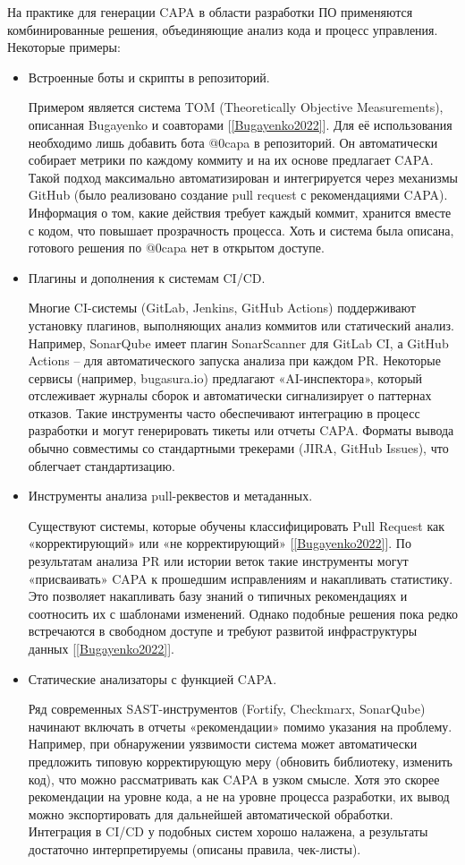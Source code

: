 На практике для генерации CAPA в области разработки ПО применяются комбинированные решения, объединяющие анализ кода и процесс управления. Некоторые примеры:

\begin{itemize}
	\item Встроенные боты и скрипты в репозиторий. 
	
	Примером является система TOM (Theoretically Objective Measurements), описанная Bugayenko  и соавторами [\ref{Bugayenko2022}]. Для её использования необходимо лишь добавить бота @0capa в репозиторий. Он автоматически собирает метрики по каждому коммиту и на их основе предлагает CAPA. Такой подход максимально автоматизирован и интегрируется через механизмы GitHub (было реализовано создание pull request с рекомендациями CAPA). Информация о том, какие действия требует каждый коммит, хранится вместе с кодом, что повышает прозрачность процесса. Хоть и система была описана, готового решения по @0capa нет в открытом доступе.
	
	\item Плагины и дополнения к системам CI/CD.
	
	Многие CI-системы (GitLab, Jenkins, GitHub Actions) поддерживают установку плагинов, выполняющих анализ коммитов или статический анализ. Например, SonarQube имеет плагин SonarScanner для GitLab CI, а GitHub Actions – для автоматического запуска анализа при каждом PR. Некоторые сервисы (например, bugasura.io) предлагают «AI-инспектора», который отслеживает журналы сборок и автоматически сигнализирует о паттернах отказов. Такие инструменты часто обеспечивают интеграцию в процесс разработки и могут генерировать тикеты или отчеты CAPA. Форматы вывода обычно совместимы со стандартными трекерами (JIRA, GitHub Issues), что облегчает стандартизацию.
	
	\item Инструменты анализа pull-реквестов и метаданных.
	
	Существуют системы, которые обучены классифицировать Pull Request как «корректирующий» или «не корректирующий» [\ref{Bugayenko2022}]. По результатам анализа PR или истории веток такие инструменты могут «присваивать» CAPA к прошедшим исправлениям и накапливать статистику.  Это позволяет накапливать базу знаний о типичных рекомендациях и соотносить их с шаблонами изменений. Однако подобные решения пока редко встречаются в свободном доступе и требуют развитой инфраструктуры данных [\ref{Bugayenko2022}]. 
	\item Статические анализаторы с функцией CAPA. 
	
	 Ряд современных SAST-инструментов (Fortify, Checkmarx, SonarQube) начинают включать в отчеты «рекомендации» помимо указания на проблему. Например, при обнаружении уязвимости система может автоматически предложить типовую корректирующую меру (обновить библиотеку, изменить код), что можно рассматривать как CAPA в узком смысле. Хотя это скорее рекомендации на уровне кода, а не на уровне процесса разработки, их вывод можно экспортировать для дальнейшей автоматической обработки. Интеграция в CI/CD у подобных систем хорошо налажена, а результаты достаточно интерпретируемы (описаны правила, чек-листы).
\end{itemize}

